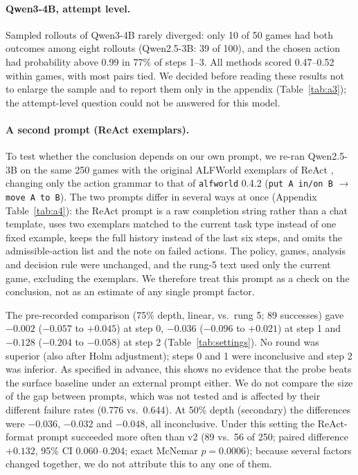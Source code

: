 \documentclass[11pt]{article}
\newcommand{\code}[1]{\texttt{#1}}
\begin{document}
\paragraph{Qwen3-4B, attempt level.} Sampled rollouts of Qwen3-4B rarely diverged: only 10 of 50 games had both outcomes among eight rollouts (Qwen2.5-3B: 39 of 100),
and the chosen action had probability above 0.99 in 77\% of steps 1--3. All methods scored 0.47--0.52 within games, with most pairs tied.
We decided before reading these results not to enlarge the sample and to report them only in the appendix (Table~\ref{tab:a3}); the attempt-level question could not be answered for this model.

\paragraph{A second prompt (ReAct exemplars).} To test whether the conclusion depends on our own prompt, we re-ran Qwen2.5-3B on the same 250 games with the original ALFWorld exemplars of ReAct
\cite{yao2023react}, changing only the action grammar to that of \code{alfworld} 0.4.2 (\code{put A in/on B} $\rightarrow$ \code{move A to B}). The two prompts differ in several ways at once (Appendix Table~\ref{tab:a4}):
the ReAct prompt is a raw completion string rather than a chat template, uses two exemplars matched to the current task type instead of one fixed example,
keeps the full history instead of the last six steps, and omits the admissible-action list and the note on failed actions. The policy, games, analysis and decision rule were unchanged,
and the rung-5 text used only the current game, excluding the exemplars. We therefore treat this prompt as a check on the conclusion, not as an estimate of any single prompt factor.

The pre-recorded comparison (75\% depth, linear, vs.\ rung 5; 89 successes) gave $-0.002$ ($-0.057$ to $+0.045$) at step 0, $-0.036$ ($-0.096$ to $+0.021$) at step 1 and $-0.128$ ($-0.204$ to $-0.058$) at step 2 (Table~\ref{tab:settings}).
No round was superior (also after Holm adjustment); steps 0 and 1 were inconclusive and step 2 was inferior. As specified in advance, this shows no evidence that the probe beats the surface baseline
under an external prompt either. We do not compare the size of the gap between prompts, which was not tested and is affected by their different failure rates (0.776 vs.\ 0.644).
At 50\% depth (secondary) the differences were $-0.036$, $-0.032$ and $-0.048$, all inconclusive. Under this setting the ReAct-format prompt succeeded more often than v2
(89 vs.\ 56 of 250; paired difference $+0.132$, 95\% CI 0.060--0.204; exact McNemar $p = 0.0006$); because several factors changed together, we do not attribute this to any one of them.
\end{document}
